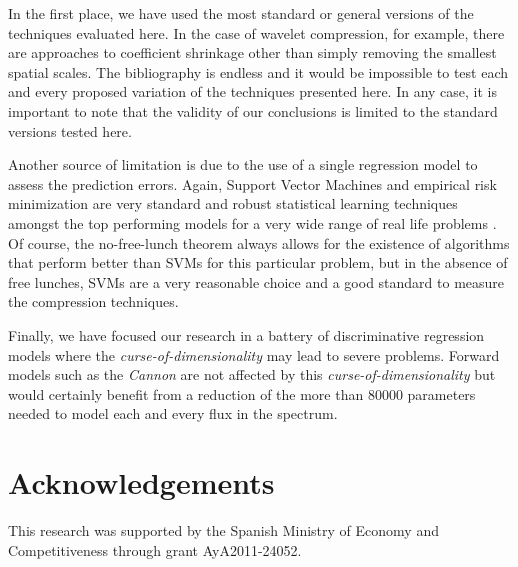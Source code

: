 \documentclass[a4paper,fleqn,usenatbib]{mnras}
\begin{document}
{In the first place, we have used the most standard or general versions of 
the techniques evaluated here. In the case of wavelet compression, for example, 
there are approaches to coefficient shrinkage other than simply removing 
the smallest spatial scales. The bibliography is endless and it would be 
impossible to test each and every proposed variation of the techniques 
presented here. In any case, it is important to note that the validity of 
our conclusions is limited to the standard versions tested here. 

Another source of limitation is due to the use of a single regression model to 
assess the prediction errors. Again, Support Vector Machines and empirical 
risk minimization are very standard and robust statistical learning techniques 
amongst the top performing models for a very wide range of real life problems 
\citep{vanGestel2004}. Of course, the no-free-lunch theorem \citep[see][and 
references therein for a formal statement of the theorem]{Igel2005} always 
allows for the existence of algorithms that perform better than SVMs for this 
particular problem, but in the absence of free lunches, SVMs are a very 
reasonable choice and a good standard to measure the compression 
techniques.

Finally, we have focused our research in a battery of discriminative regression 
models where the {\it curse-of-dimensionality} may lead to severe problems. Forward 
models such as the {\it Cannon} \citep{2015ApJ...808...16N} are not affected by 
this {\it curse-of-dimensionality} but would certainly benefit from a reduction 
of the more than 80000 parameters needed to model each and every flux in the spectrum.

\section*{Acknowledgements}
This research was supported by the Spanish Ministry of Economy and
Competitiveness through grant AyA2011-24052.









}
\end{document}
